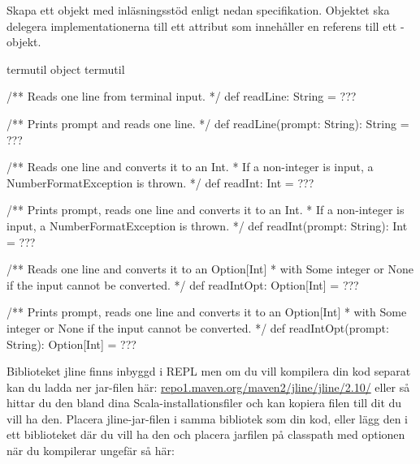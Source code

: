 \Subtask Skapa ett objekt med inläsningsstöd enligt nedan specifikation. Objektet ska delegera implementationerna till ett attribut  som innehåller en referens till ett -objekt.
\begin{ScalaSpec}{termutil}
object termutil {
  /** Reads one line from terminal input. */
  def readLine: String = ???

  /** Prints prompt and reads one line. */
  def readLine(prompt: String): String = ???

  /** Reads one line and converts it to an Int.
   *  If a non-integer is input, a NumberFormatException is thrown.  */
  def readInt: Int = ???

  /** Prints prompt, reads one line and converts it to an Int.
   *  If a non-integer is input, a NumberFormatException is thrown.  */
  def readInt(prompt: String): Int = ???

  /** Reads one line and converts it to an Option[Int]
   *  with Some integer or None if the input cannot be converted.  */
  def readIntOpt: Option[Int] = ???

  /** Prints prompt, reads one line and converts it to an Option[Int]
   *  with Some integer or None if the input cannot be converted.  */
  def readIntOpt(prompt: String): Option[Int] = ???
}
\end{ScalaSpec}
Biblioteket jline finns inbyggd i REPL men om du vill kompilera din kod separat kan du ladda ner jar-filen här: \href{http://repo1.maven.org/maven2/jline/jline/2.10/}{repo1.maven.org/maven2/jline/jline/2.10/} eller så hittar du den bland dina Scala-installationsfiler och kan kopiera filen till dit du vill ha den. Placera jline-jar-filen i samma bibliotek som din kod, eller lägg den i ett biblioteket där du vill ha den och placera jarfilen på classpath med optionen  när du kompilerar ungefär så här: \\
